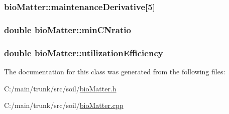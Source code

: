 \label{classbio_matter_aeb728b264870ae8765d7aa01cc617de3}
\hypertarget{classbio_matter_a33a01ec3e0a379392d4843ed9ce3f07d}{
\subsubsection[{maintenanceDerivative}]{ {\bf bioMatter::maintenanceDerivative}\mbox{[}5\mbox{]}}}
\label{classbio_matter_a33a01ec3e0a379392d4843ed9ce3f07d}
\hypertarget{classbio_matter_a21cbe8a3a8d628f8e4be1d8e98225fc4}{
\subsubsection[{minCNratio}]{\setlength{\rightskip}{0pt plus 5cm}double {\bf bioMatter::minCNratio}}}
\label{classbio_matter_a21cbe8a3a8d628f8e4be1d8e98225fc4}
\hypertarget{classbio_matter_a7e4373da6cb4863f815e793ffa69922a}{
\subsubsection[{utilizationEfficiency}]{\setlength{\rightskip}{0pt plus 5cm}double {\bf bioMatter::utilizationEfficiency}}}
\label{classbio_matter_a7e4373da6cb4863f815e793ffa69922a}


The documentation for this class was generated from the following files:\begin{DoxyCompactItemize}
\item 
C:/main/trunk/src/soil/\hyperlink{bio_matter_8h}{bioMatter.h}\item 
C:/main/trunk/src/soil/\hyperlink{bio_matter_8cpp}{bioMatter.cpp}\end{DoxyCompactItemize}
